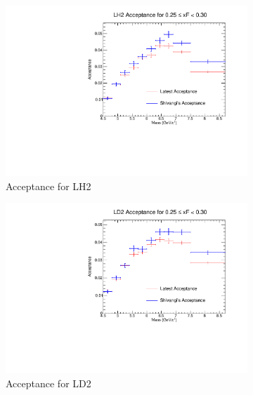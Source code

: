 \documentclass[11pt]{article}
\begin{document}
\begin{figure}[p]
    \centering
    \begin{subfigure}[b]{0.48\textwidth}
       \includegraphics[width=\linewidth]{./acceptancePlots/LH2_acceptance_xF_bin_5.pdf}
       \caption{Acceptance for LH2}
    \end{subfigure}\hfill
    \begin{subfigure}[b]{0.48\textwidth}
       \includegraphics[width=\linewidth]{./acceptancePlots/LD2_acceptance_xF_bin_5.pdf}
       \caption{Acceptance for LD2}
    \end{subfigure}
    \begin{subfigure}[b]{0.48\textwidth}

\end{subfigure}
\end{figure}
\end{document}

